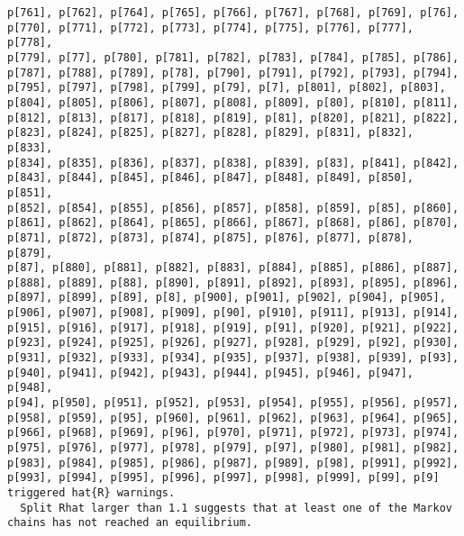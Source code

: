 \documentclass[
  letterpaper,
  DIV=11,
  numbers=noendperiod]{scrartcl}
\begin{document}
\begin{verbatim}
p[761], p[762], p[764], p[765], p[766], p[767], p[768], p[769], p[76],
p[770], p[771], p[772], p[773], p[774], p[775], p[776], p[777], p[778],
p[779], p[77], p[780], p[781], p[782], p[783], p[784], p[785], p[786],
p[787], p[788], p[789], p[78], p[790], p[791], p[792], p[793], p[794],
p[795], p[797], p[798], p[799], p[79], p[7], p[801], p[802], p[803],
p[804], p[805], p[806], p[807], p[808], p[809], p[80], p[810], p[811],
p[812], p[813], p[817], p[818], p[819], p[81], p[820], p[821], p[822],
p[823], p[824], p[825], p[827], p[828], p[829], p[831], p[832], p[833],
p[834], p[835], p[836], p[837], p[838], p[839], p[83], p[841], p[842],
p[843], p[844], p[845], p[846], p[847], p[848], p[849], p[850], p[851],
p[852], p[854], p[855], p[856], p[857], p[858], p[859], p[85], p[860],
p[861], p[862], p[864], p[865], p[866], p[867], p[868], p[86], p[870],
p[871], p[872], p[873], p[874], p[875], p[876], p[877], p[878], p[879],
p[87], p[880], p[881], p[882], p[883], p[884], p[885], p[886], p[887],
p[888], p[889], p[88], p[890], p[891], p[892], p[893], p[895], p[896],
p[897], p[899], p[89], p[8], p[900], p[901], p[902], p[904], p[905],
p[906], p[907], p[908], p[909], p[90], p[910], p[911], p[913], p[914],
p[915], p[916], p[917], p[918], p[919], p[91], p[920], p[921], p[922],
p[923], p[924], p[925], p[926], p[927], p[928], p[929], p[92], p[930],
p[931], p[932], p[933], p[934], p[935], p[937], p[938], p[939], p[93],
p[940], p[941], p[942], p[943], p[944], p[945], p[946], p[947], p[948],
p[94], p[950], p[951], p[952], p[953], p[954], p[955], p[956], p[957],
p[958], p[959], p[95], p[960], p[961], p[962], p[963], p[964], p[965],
p[966], p[968], p[969], p[96], p[970], p[971], p[972], p[973], p[974],
p[975], p[976], p[977], p[978], p[979], p[97], p[980], p[981], p[982],
p[983], p[984], p[985], p[986], p[987], p[989], p[98], p[991], p[992],
p[993], p[994], p[995], p[996], p[997], p[998], p[999], p[99], p[9]
triggered hat{R} warnings.
  Split Rhat larger than 1.1 suggests that at least one of the Markov
chains has not reached an equilibrium.
 

\end{verbatim}
\end{document}
